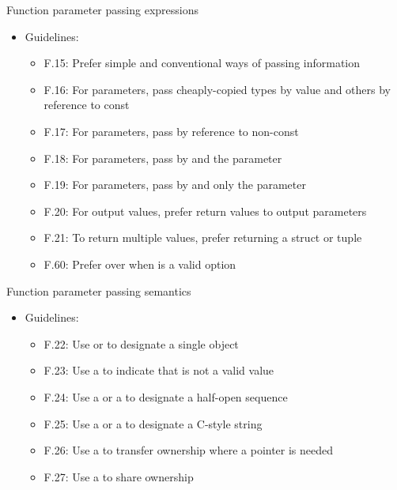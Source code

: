 

\begin{frame}[t]{Function parameter passing expressions}
\begin{itemize}
  \item Guidelines:
    \begin{itemize}
      \item F.15: Prefer simple and conventional ways of passing information
      \item F.16: For  parameters, pass cheaply-copied types by value and 
            others by reference to const
      \item F.17: For  parameters, pass by reference to non-const
      \item F.18: For  parameters, pass by  and 
             the parameter
      \item F.19: For  parameters, 
            pass by  and only  the parameter
      \item F.20: For  output values, prefer return values to output parameters
      \item F.21: To return multiple  values, prefer returning a struct or tuple
      \item F.60: Prefer  over  when  is a valid option
    \end{itemize}
\end{itemize}
\end{frame}



\begin{frame}[t]{Function parameter passing semantics}
\begin{itemize}
  \item Guidelines:
    \begin{itemize}
      \item F.22: Use  or  to designate a single object
      \item F.23: Use a  to indicate that  is not a valid value
      \item F.24: Use a  or a  to designate a half-open sequence
      \item F.25: Use a  or a  to designate a C-style string
      \item F.26: Use a  to transfer ownership where a pointer is needed
      \item F.27: Use a  to share ownership
    \end{itemize}
\end{itemize}
\end{frame}

